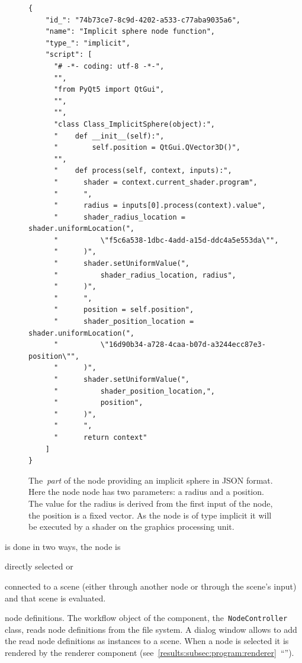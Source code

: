 \documentclass[%
    a4paper,    %
    justified,  %
    nobib,      %
    openany     %
]{tufte-book}
\makeatletter
\renewcommand{\label}[1]{\@tufte@label{##1}}%
\makeatother
\begin{document}
\begin{figure}
  \begin{verbatim}
{
    "id_": "74b73ce7-8c9d-4202-a533-c77aba9035a6",
    "name": "Implicit sphere node function",
    "type_": "implicit",
    "script": [
      "# -*- coding: utf-8 -*-",
      "",
      "from PyQt5 import QtGui",
      "",
      "",
      "class Class_ImplicitSphere(object):",
      "    def __init__(self):",
      "        self.position = QtGui.QVector3D()",
      "",
      "    def process(self, context, inputs):",
      "      shader = context.current_shader.program",
      "      ",
      "      radius = inputs[0].process(context).value",
      "      shader_radius_location = shader.uniformLocation(",
      "          \"f5c6a538-1dbc-4add-a15d-ddc4a5e553da\"",
      "      )",
      "      shader.setUniformValue(",
      "          shader_radius_location, radius",
      "      )",
      "      ",
      "      position = self.position",
      "      shader_position_location = shader.uniformLocation(",
      "          \"16d90b34-a728-4caa-b07d-a3244ecc87e3-position\"",
      "      )",
      "      shader.setUniformValue(",
      "          shader_position_location,",
      "          position",
      "      )",
      "      ",
      "      return context"
    ]
}
  \end{verbatim}
\caption{The~\emph{part} of the node providing an implicit sphere in JSON
  format. Here the node node has two parameters: a radius and a position. The
  value for the radius is derived from the first input of the node, the position
  is a fixed vector. As the node is of type implicit it will be executed by a
  shader on the graphics processing unit.}
\label{fig:node-part-example}
\end{figure}

 is done in two ways, the node is
\begin{enumerate*}
  \item directly selected or
  \item connected to a scene (either through another node or
    through the scene's input) and that scene is evaluated.
\end{enumerate*}

 node definitions. The workflow object of the
component, the~\verb=NodeController= class, reads node definitions from the file
system. A dialog window allows to add the read node definitions as instances to
a scene. When a node is selected it is rendered by the renderer component
(see~\cref{results:subsec:program:renderer}~\enquote{}).
\end{document}
